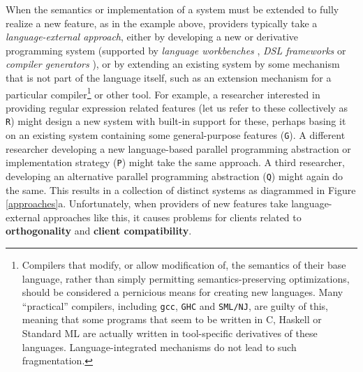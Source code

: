 When the semantics or implementation of a system must be extended to fully realize a new feature, as in the example above, providers typically take a \emph{language-external approach}, either by developing a new or derivative programming system (supported by \emph{language workbenches} \cite{erdweg2013state},  \emph{DSL frameworks} \cite{fowler2010domain} or \emph{compiler generators} \cite{brooker1963compiler}), or by extending an existing system by some mechanism that is not part of the language itself, such as an extension mechanism for a {particular} compiler\footnote{Compilers that modify, or allow modification of, the semantics of their base language, rather than simply permitting semantics-preserving optimizations, should be considered a pernicious means for creating new languages. Many ``practical'' compilers, including \texttt{gcc}, \texttt{GHC} and \texttt{SML/NJ}, are guilty of this, meaning that some programs that seem to be written in C, Haskell or Standard ML are actually written in tool-specific derivatives of these languages. Language-integrated mechanisms do not lead to such fragmentation.} or other tool. For example, a researcher interested in providing regular expression related features (let us refer to these collectively as \texttt{R}) might design a new system with built-in support for these, perhaps basing it on an existing system containing some general-purpose features (\texttt{G}). A different researcher developing a new language-based parallel programming abstraction or implementation strategy (\texttt{P}) might  take the same approach. A third researcher, developing an alternative parallel programming abstraction (\texttt{Q}) might again do the same. This results in a collection of distinct systems as diagrammed in Figure \ref{approaches}a. Unfortunately, when providers of new features take language-external approaches like this, it causes  problems for clients related to \textbf{orthogonality} and \textbf{client compatibility}. %

